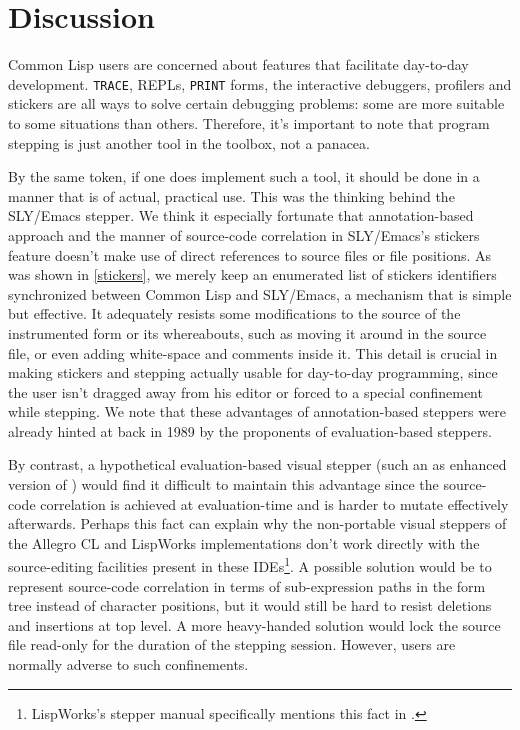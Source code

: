 \documentclass[sigconf]{acmart}
\begin{document}
\section{Discussion}

Common Lisp users are concerned about features that facilitate
day-to-day development.  \texttt{TRACE}, REPLs, \texttt{PRINT} forms,
the interactive debuggers, profilers and stickers are all ways to
solve certain debugging problems: some are more suitable to some
situations than others.  Therefore, it's important to note that
program stepping is just another tool in the toolbox, not a panacea.

By the same token, if one does implement such a tool, it should be
done in a manner that is of actual, practical use.  This was the
thinking behind the SLY/Emacs stepper.  We think it especially
fortunate that annotation-based approach and the manner of source-code
correlation in SLY/Emacs's stickers feature doesn't make use of direct
references to source files or file positions.  As was shown in
\ref{stickers}, we merely keep an enumerated list of stickers
identifiers synchronized between Common Lisp and SLY/Emacs, a
mechanism that is simple but effective.  It adequately resists some
modifications to the source of the instrumented form or its
whereabouts, such as moving it around in the source file, or even
adding white-space and comments inside it.  This detail is crucial in
making stickers and stepping actually usable for day-to-day
programming, since the user isn't dragged away from his editor or
forced to a special confinement while stepping.  We note that these
advantages of annotation-based steppers were already hinted at back in
1989 by the proponents of evaluation-based steppers\cite[l.41,
l.42]{evaluation-based}.

By contrast, a hypothetical evaluation-based visual stepper (such an
as enhanced version of \cite{bourguignon}) would find it difficult to
maintain this advantage since the source-code correlation is achieved
at evaluation-time and is harder to mutate effectively afterwards.
Perhaps this fact can explain why the non-portable visual steppers of
the Allegro CL and LispWorks implementations don't work directly with
the source-editing facilities present in these
IDEs\footnote{LispWorks's stepper manual specifically mentions this
  fact in \cite{lispworks-stepper}.}.  A possible solution would be to
represent source-code correlation in terms of sub-expression paths in
the form tree instead of character positions, but it would still be
hard to resist deletions and insertions at top level.  A more
heavy-handed solution would lock the source file read-only for the
duration of the stepping session.  However, users are normally adverse
to such confinements.
\end{document}

